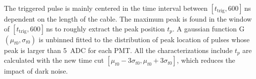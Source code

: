 The triggered pulse is mainly centered in the time interval between $[t_{\mathrm{trig}}, 600]$\,ns dependent on the length of the cable. The maximum peak is found in the window of $[t_{\mathrm{trig}}, 600]$\,ns to roughly extract the peak position $t_p$. A gaussian function G$(\mu_{t0},\sigma_{t0})$ is unbinned fitted to the distribution of peak location of pulses whose peak is larger than \SI{5}{ADC} for each PMT. %
 All the characterizations include $t_p$ are calculated with the new time cut $[\mu_{t0}-3\sigma_{t0}, \mu_{t0}+3\sigma_{t0}]$, which reduces the impact of dark noise.






